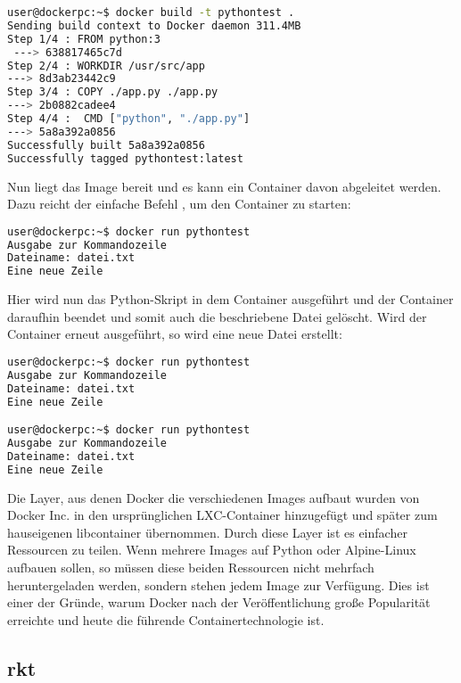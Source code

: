 \begin{lstlisting}[language=bash,caption={Terminalausgabe docker build},label={code:dockerbuild}]
user@dockerpc:~$ docker build -t pythontest .
Sending build context to Docker daemon 311.4MB
Step 1/4 : FROM python:3
 ---> 638817465c7d
Step 2/4 : WORKDIR /usr/src/app
---> 8d3ab23442c9
Step 3/4 : COPY ./app.py ./app.py
---> 2b0882cadee4
Step 4/4 :  CMD ["python", "./app.py"]
---> 5a8a392a0856
Successfully built 5a8a392a0856
Successfully tagged pythontest:latest
\end{lstlisting}

Nun liegt das Image bereit und es kann ein Container davon abgeleitet werden. Dazu reicht der einfache Befehl , um den Container zu starten:

\begin{lstlisting}[language=bash,caption={Terminalausgabe docker run},label={code:dockerbuild}]
user@dockerpc:~$ docker run pythontest
Ausgabe zur Kommandozeile
Dateiname: datei.txt
Eine neue Zeile
\end{lstlisting}

Hier wird nun das Python-Skript in dem Container ausgeführt und der Container daraufhin beendet und somit auch die beschriebene Datei gelöscht. Wird der Container erneut ausgeführt, so wird eine neue Datei erstellt:

\begin{lstlisting}[language=bash,caption={Terminalausgabe docker run mehrfach},label={code:dockerbuild}]
user@dockerpc:~$ docker run pythontest
Ausgabe zur Kommandozeile
Dateiname: datei.txt
Eine neue Zeile

user@dockerpc:~$ docker run pythontest
Ausgabe zur Kommandozeile
Dateiname: datei.txt
Eine neue Zeile
\end{lstlisting}

Die Layer, aus denen Docker die verschiedenen Images aufbaut wurden von Docker Inc. in den ursprünglichen \ac{LXC}-Container hinzugefügt und später zum hauseigenen libcontainer übernommen. Durch diese Layer ist es einfacher Ressourcen zu teilen. Wenn mehrere Images auf Python oder Alpine-Linux aufbauen sollen, so müssen diese beiden Ressourcen nicht mehrfach heruntergeladen werden, sondern stehen jedem Image zur Verfügung. Dies ist einer der Gründe, warum Docker nach der Veröffentlichung große Popularität erreichte und heute die führende Containertechnologie ist. \citep{dockermilestones}



\subsection*{rkt}
\label{sec:rkt}

